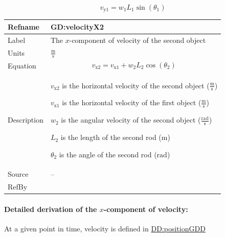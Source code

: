 \documentclass[12pt]{article}
\begin{document}
\begin{displaymath}
{v_{\text{y}1}}={w_{1}} {L_{1}} \sin\left({θ_{1}}\right)
\end{displaymath}
\vspace{\baselineskip}
\noindent
\begin{minipage}{\textwidth}
\begin{tabular}{>{\raggedright}p{}>{\raggedright\arraybackslash}p{}}
\toprule \textbf{Refname} & \textbf{GD:velocityX2}
\label{GD:velocityX2}
\\ \midrule
Label & The $x$-component of velocity of the second object
        
\\ \midrule
Units & $\frac{\text{m}}{\text{s}}$
        
\\ \midrule
Equation & \begin{displaymath}
           {v_{\text{x}2}}={v_{\text{x}1}}+{w_{2}} {L_{2}} \cos\left({θ_{2}}\right)
           \end{displaymath}
\\ \midrule
Description & \begin{symbDescription}
              \item{${v_{\text{x}2}}$ is the horizontal velocity of the second object ($\frac{\text{m}}{\text{s}}$)}
              \item{${v_{\text{x}1}}$ is the horizontal velocity of the first object ($\frac{\text{m}}{\text{s}}$)}
              \item{${w_{2}}$ is the angular velocity of the second object ($\frac{\text{rad}}{\text{s}}$)}
              \item{${L_{2}}$ is the length of the second rod (${\text{m}}$)}
              \item{${θ_{2}}$ is the angle of the second rod (${\text{rad}}$)}
              \end{symbDescription}
\\ \midrule
Source & --
         
\\ \midrule
RefBy & 
\\ \bottomrule
\end{tabular}
\end{minipage}
\paragraph{Detailed derivation of the $x$-component of velocity:}
\label{GD:velocityX2Deriv}
At a given point in time, velocity is defined in \hyperref[DD:positionGDD]{DD:positionGDD}
\end{document}
